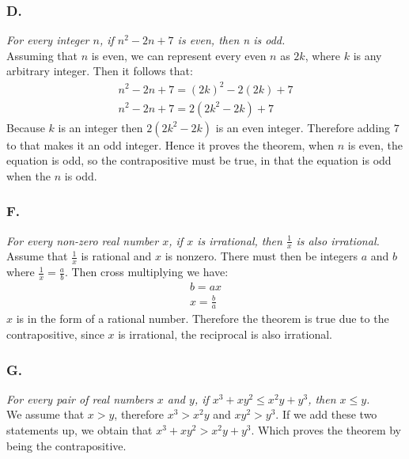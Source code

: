 \documentclass[titlepage]{article}\pagestyle{empty}
\begin{document}
\subsubsection*{D.}
\textit{For every integer $n$, if $n^2 - 2n + 7$ is even, then n is odd.}\\
Assuming that $n$ is even, we can represent every even $n$ as $2k$, where $k$ is any arbitrary integer. Then it follows that:
\begin{displaymath}
\begin{array}{c}
n^2 - 2n + 7 = (2k)^2 - 2(2k) + 7\\
n^2 - 2n + 7 = 2(2k^2 - 2k) + 7
\end{array}
\end{displaymath}
Because $k$ is an integer then $2(2k^2 - 2k)$ is an even integer. Therefore adding $7$ to that makes it an odd integer. Hence it proves the theorem, when $n$ is even, the equation is odd, so the contrapositive must be true, in that the equation is odd when the $n$ is odd.
\subsubsection*{F.}
\textit{For every non-zero real number $x$, if $x$ is irrational, then $\frac{1}{x}$ is also irrational.}\\
Assume that $\frac{1}{x}$ is rational and $x$ is nonzero. There must then be integers $a$ and $b$ where $\frac{1}{x} = \frac{a}{b}$. Then cross multiplying we have:
\begin{displaymath}
\begin{array}{c}
b = ax\\
x = \frac{b}{a}
\end{array}
\end{displaymath}
$x$ is in the form of a rational number. Therefore the theorem is true due to the contrapositive, since $x$ is irrational, the reciprocal is also irrational.
\subsubsection*{G.}
 \textit{For every pair of real numbers $x$ and $y$, if $x^3 + xy^2 \le x^2y + y^3$, then $x \le y$.}\\
We assume that $x > y$, therefore $x^3 > x^{2}y$ and $xy^2 > y^3$. If we add these two statements up, we obtain that $x^3 + xy^2 > x^{2}y + y^3$. Which proves the theorem by being the contrapositive.
\end{document}
